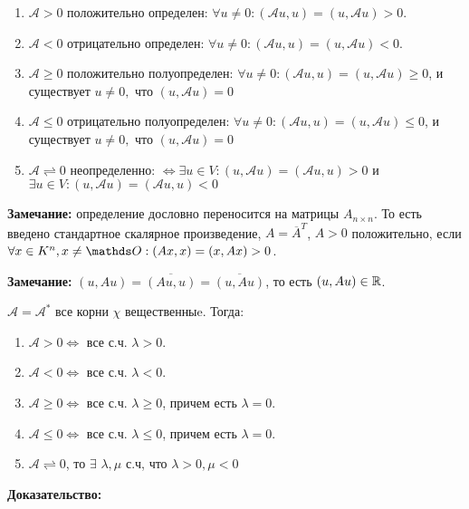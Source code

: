 \begin{enumerate}
    \item $\mathcal{A} > 0$ положительно определен: $\forall u \neq 0: (\mathcal{A}u,u) = (u, \mathcal{A}u)>0$.
     \item $\mathcal{A} < 0$ отрицательно определен: $\forall u \neq 0: (\mathcal{A}u,u) = (u, \mathcal{A}u)<0$.
     \item $\mathcal{A} \geq 0$ положительно полуопределен: $\forall u \neq 0: (\mathcal{A}u,u) = (u, \mathcal{A}u)\geq0$, и существует $u\neq 0,$ что $(u, \mathcal{A}u)=0$
     \item $\mathcal{A} \leq 0$ отрицательно полуопределен: $\forall u \neq 0: (\mathcal{A}u,u) = (u, \mathcal{A}u)\leq0$, и существует $u\neq 0,$ что $(u, \mathcal{A}u)=0$
    \item $\mathcal{A} \rightleftharpoons  0$ неопределенно: $\Leftrightarrow  \exists u \in V: (u,\mathcal{A}u) = (\mathcal{A}u,u) >0$ и  $\exists u \in V: (u,\mathcal{A}u) = (\mathcal{A}u,u)<0$
\end{enumerate}

\textbf{Замечание:} определение дословно переносится на матрицы $A_{n \times n}$. То есть введено стандартное скалярное произведение, $A = \overline{A}^T$, $A>0$ положительно, если $\forall x \in K^n, x \neq \zero: (Ax,x) = (x,Ax) > 0$.

\textbf{Замечание:} $(u,Au) = \overline{(Au, u)} = \overline{(u, Au)}$, то есть  $(u,Au) \in \mathbb{R}$.


$\mathcal{A} = \mathcal{A}^*$ все корни $\chi$ вещественныe. Тогда:

\begin{enumerate}
    \item $\mathcal{A} > 0 \Leftrightarrow$ все с.ч. $\lambda >0$. 
     \item $\mathcal{A} < 0 \Leftrightarrow$ все с.ч. $\lambda <0$. 
     \item $\mathcal{A} \geq 0 \Leftrightarrow$ все с.ч. $\lambda \geq0$, причем есть $\lambda =0 $. 
     \item $\mathcal{A} \leq0 \Leftrightarrow$ все с.ч. $\lambda \leq0$, причем есть $\lambda =0 $. 
    \item $\mathcal{A} \rightleftharpoons  0$, то $\exists $ $\lambda,\mu$ с.ч, что $\lambda >0, \mu<0$
\end{enumerate}

\textbf{Доказательство:}

